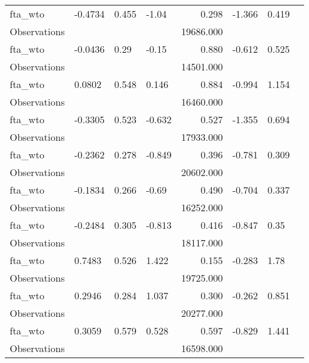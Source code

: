 \begin{tabular}{llllrlll}
fta\_wto      &    -0.4734 &   0.455 &  -1.04 &      0.298 & -1.366 &  0.419 &              \\
Observations &            &         &        &  19686.000 &        &        &              \\
fta\_wto      &    -0.0436 &    0.29 &  -0.15 &      0.880 & -0.612 &  0.525 &              \\
Observations &            &         &        &  14501.000 &        &        &              \\
fta\_wto      &     0.0802 &   0.548 &  0.146 &      0.884 & -0.994 &  1.154 &              \\
Observations &            &         &        &  16460.000 &        &        &              \\
fta\_wto      &    -0.3305 &   0.523 & -0.632 &      0.527 & -1.355 &  0.694 &              \\
Observations &            &         &        &  17933.000 &        &        &              \\
fta\_wto      &    -0.2362 &   0.278 & -0.849 &      0.396 & -0.781 &  0.309 &              \\
Observations &            &         &        &  20602.000 &        &        &              \\
fta\_wto      &    -0.1834 &   0.266 &  -0.69 &      0.490 & -0.704 &  0.337 &              \\
Observations &            &         &        &  16252.000 &        &        &              \\
fta\_wto      &    -0.2484 &   0.305 & -0.813 &      0.416 & -0.847 &   0.35 &              \\
Observations &            &         &        &  18117.000 &        &        &              \\
fta\_wto      &     0.7483 &   0.526 &  1.422 &      0.155 & -0.283 &   1.78 &              \\
Observations &            &         &        &  19725.000 &        &        &              \\
fta\_wto      &     0.2946 &   0.284 &  1.037 &      0.300 & -0.262 &  0.851 &              \\
Observations &            &         &        &  20277.000 &        &        &              \\
fta\_wto      &     0.3059 &   0.579 &  0.528 &      0.597 & -0.829 &  1.441 &              \\
Observations &            &         &        &  16598.000 &        &        &              \\

\end{tabular}
